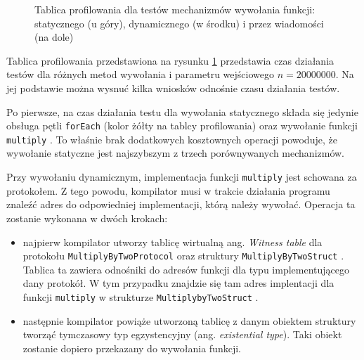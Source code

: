 \documentclass[mgr, shortabstract]{iithesis}
\newcommand{\ang}[1]{ang. \textit{#1}}
\newcommand{\swiftinline}[1]{
    \texttt{#1}
}
\begin{document}
\begin{figure}
    \caption{Tablica profilowania dla testów mechanizmów wywołania funkcji: statycznego (u góry), dynamicznego (w środku) i przez wiadomości (na dole)}
    \label{i:dispatch_method}
\end{figure}

Tablica profilowania przedstawiona na rysunku \ref{i:dispatch_method} przedstawia czas działania testów dla różnych metod wywołania i parametru wejściowego $n = 20000000$. Na jej podstawie można wysnuć kilka wniosków odnośnie czasu działania testów.

Po pierwsze, na czas działania testu dla wywołania statycznego składa się jedynie obsługa pętli \swiftinline{forEach} (kolor żółty na tablcy profilowania) oraz wywołanie funkcji \swiftinline{multiply}. To właśnie brak dodatkowych kosztownych operacji powoduje, że wywołanie statyczne jest najszybszym z trzech porównywanych mechanizmów.

Przy wywołaniu dynamicznym, implementacja funkcji \swiftinline{multiply} jest schowana za protokołem. Z tego powodu, kompilator musi w trakcie działania programu znaleźć adres do odpowiedniej implementacji, którą należy wywołać. Operacja ta zostanie wykonana w dwóch krokach:

\begin{itemize}
    \item najpierw kompilator utworzy tablicę wirtualną \ang{Witness table} dla protokołu \swiftinline{MultiplyByTwoProtocol} oraz struktury \swiftinline{MultiplyByTwoStruct}. Tablica ta zawiera odnośniki do adresów funkcji dla typu implementującego dany protokół. W tym przypadku znajdzie się tam adres implentacji dla funkcji \swiftinline{multiply} w strukturze \swiftinline{MultiplybyTwoStruct}.
    \item następnie kompilator powiąże utworzoną tablicę z danym obiektem struktury tworząć tymczasowy typ egzystencyjny (\ang{existential type}). Taki obiekt zostanie dopiero przekazany do wywołania funkcji.
\end{itemize}
\end{document}

